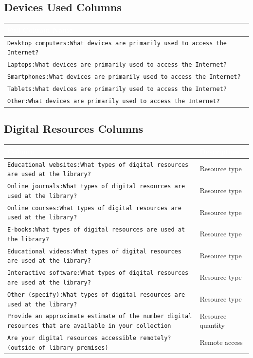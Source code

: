 \documentclass[11pt,a4paper]{article}
\begin{document}
\subsection{Devices Used Columns}

\begin{longtable}{|p{14cm}|}
\hline
\rowcolor{headerblue}\textcolor{white}{\textbf{Full Column Name}} \\
\hline
\texttt{Desktop computers:What devices are primarily used to access the Internet?} \\
\hline
\texttt{Laptops:What devices are primarily used to access the Internet?} \\
\hline
\texttt{Smartphones:What devices are primarily used to access the Internet?} \\
\hline
\texttt{Tablets:What devices are primarily used to access the Internet?} \\
\hline
\texttt{Other:What devices are primarily used to access the Internet?} \\
\hline
\end{longtable}

\subsection{Digital Resources Columns}

\begin{longtable}{|p{9cm}|p{5cm}|}
\hline
\rowcolor{headerblue}\textcolor{white}{\textbf{Column}} & \textcolor{white}{\textbf{Description}} \\
\hline
\texttt{Educational websites:What types of digital resources are used at the library?} & Resource type \\
\hline
\texttt{Online journals:What types of digital resources are used at the library?} & Resource type \\
\hline
\texttt{Online courses:What types of digital resources are used at the library?} & Resource type \\
\hline
\texttt{E-books:What types of digital resources are used at the library?} & Resource type \\
\hline
\texttt{Educational videos:What types of digital resources are used at the library?} & Resource type \\
\hline
\texttt{Interactive software:What types of digital resources are used at the library?} & Resource type \\
\hline
\texttt{Other (specify):What types of digital resources are used at the library?} & Resource type \\
\hline
\texttt{Provide an approximate estimate of the number digital resources that are available in your collection} & Resource quantity \\
\hline
\texttt{Are your digital resources accessible remotely? (outside of library premises)} & Remote access \\
\hline
\end{longtable}
\end{document}
